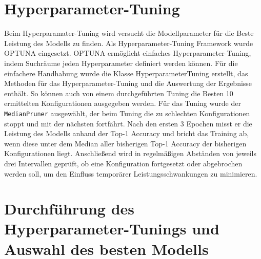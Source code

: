\documentclass[12pt,oneside]{article}
\begin{document}
  
  \section{Hyperparameter-Tuning}
  Beim Hyperparamater-Tuning wird versucht die Modellparameter für die Beste Leistung des Modells zu finden. Als Hyperparameter-Tuning Framework wurde OPTUNA \cite{noauthor_optuna_nodate} eingesetzt. OPTUNA ermöglicht einfaches Hyperparameter-Tuning, indem Suchräume jeden Hyperparameter definiert werden können. Für die einfachere Handhabung wurde die Klasse HyperparameterTuning erstellt, das Methoden für das Hyperparameter-Tuning und die Auswertung der Ergebnisse enthält. So können auch von einem durchgeführten Tuning die Besten 10 ermittelten Konfigurationen ausgegeben werden.
  Für das Tuning wurde der \texttt{MedianPruner} ausgewählt, der beim Tuning die zu schlechten Konfigurationen stoppt und mit der nächsten fortfährt. Nach den ersten 3 Epochen misst er die Leistung des Modells anhand der Top-1 Accuracy und bricht das Training ab, wenn diese unter dem Median aller bisherigen Top-1 Accuracy der bisherigen Konfigurationen liegt. Anschließend wird in regelmäßigen Abständen von jeweils drei Intervallen geprüft, ob eine Konfiguration fortgesetzt oder abgebrochen werden soll, um den Einfluss temporärer Leistungsschwankungen zu minimieren.
  
  
  \section{Durchführung des Hyperparameter-Tunings und Auswahl des besten Modells}	  
\end{document}
